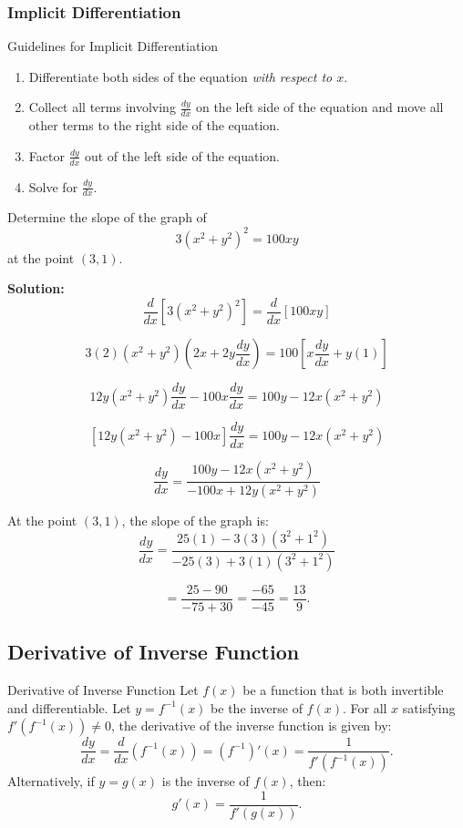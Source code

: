 \documentclass[12pt]{article}
\theoremstyle{beautifulthm}
\begin{document}
\subsubsection{Implicit Differentiation}
\begin{Note}{Guidelines for Implicit Differentiation}{}

\begin{enumerate}
    \item Differentiate both sides of the equation \textit{with respect to \(x\)}.
    \item Collect all terms involving \(\frac{dy}{dx}\) on the left side of the equation and move all other terms to the right side of the equation.
    \item Factor \(\frac{dy}{dx}\) out of the left side of the equation.
    \item Solve for \(\frac{dy}{dx}\).
\end{enumerate}
\end{Note}




\begin{tcolorbox}[colback=examplebg, colframe=red!75!black, title=\textbf{EXAMPLE : Find the Derivative of the function}, fonttitle=\bfseries, sharp corners]

Determine the slope of the graph of 
\[
3(x^2 + y^2)^2 = 100xy
\]
at the point \((3, 1)\).

\tcblower
\textbf{Solution:}
\[
\frac{d}{dx} \left[3(x^2 + y^2)^2 \right] = \frac{d}{dx} \left[100xy \right]
\]

\[
3(2)(x^2 + y^2)\left(2x + 2y\frac{dy}{dx}\right) = 100\left[x\frac{dy}{dx} + y(1)\right]
\]

\[
12y(x^2 + y^2)\frac{dy}{dx} - 100x\frac{dy}{dx} = 100y - 12x(x^2 + y^2)
\]

\[
\left[12y(x^2 + y^2) - 100x\right]\frac{dy}{dx} = 100y - 12x(x^2 + y^2)
\]

\[
\frac{dy}{dx} = \frac{100y - 12x(x^2 + y^2)}{-100x + 12y(x^2 + y^2)}
\]

At the point \((3, 1)\), the slope of the graph is:
\[
\frac{dy}{dx} = \frac{25(1) - 3(3)(3^2 + 1^2)}{-25(3) + 3(1)(3^2 + 1^2)}
\]

\[
= \frac{25 - 90}{-75 + 30} = \frac{-65}{-45} = \frac{13}{9}.
\]

\end{tcolorbox}
\newpage
\subsection{Derivative of Inverse Function}
\begin{mytheorem}{Derivative of Inverse Function}{}
Let $f(x)$ be a function that is both invertible and differentiable. Let $y = f^{-1}(x)$ be the inverse of $f(x)$. For all $x$ satisfying $f'(f^{-1}(x)) \neq 0$, the derivative of the inverse function is given by:
\[
\frac{dy}{dx} = \frac{d}{dx}(f^{-1}(x)) = (f^{-1})'(x) = \frac{1}{f'(f^{-1}(x))}.
\]
Alternatively, if $y = g(x)$ is the inverse of $f(x)$, then:
\[
g'(x) = \frac{1}{f'(g(x))}.
\]
\end{mytheorem}
\end{document}
